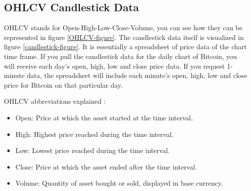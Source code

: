 \subsection*{OHLCV Candlestick Data}
OHLCV stands for Open-High-Low-Close-Volume, you can see how they can be represented in figure \ref{OHLCV-figure}. The candlestick data itself is visualized in figure \ref{candlestick-figure}. It is essentially a spreadsheet of price data of the chart time frame. If you pull the candlestick data for the daily chart of Bitcoin, you will receive each day's open, high, low and close price data. If you request 1-minute data, the spreadsheet will include each minute's open, high, low and close price for Bitcoin on that particular day.

OHLCV abbreviations explained \cite{kaiko-ohlcv}:
\begin{itemize}
    \item Open: Price at which the asset started at the time interval.
    \item High: Highest price reached during the time interval.
    \item Low: Lowest price reached during the time interval.
    \item Close: Price at which the asset ended after the time interval.
    \item Volume: Quantity of asset bought or sold, displayed in base currency.
\end{itemize}

